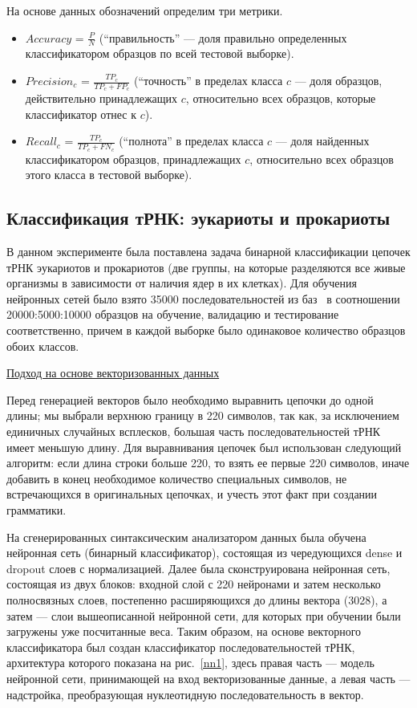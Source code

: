 На основе данных обозначений определим три метрики.
\begin{itemize}
    \item $Accuracy$ = $\frac{P}{N}$ (``правильность'' --- доля правильно определенных классификатором образцов по всей тестовой выборке).
    \item $Precision_{c}$ = $\frac{TP_{c}}{TP_{c} + FP_{c}}$ (``точность'' в пределах класса $c$ --- доля образцов, действительно принадлежащих $c$, относительно всех образцов, которые классификатор отнес к $c$).
    \item $Recall_{c}$ = $\frac{TP_{c}}{TP_{c} + FN_{c}}$  (``полнота'' в пределах класса $c$ --- доля найденных классификатором образцов, принадлежащих $c$, относительно всех образцов этого класса в тестовой выборке).
\end{itemize}


\subsection{Классификация тРНК: эукариоты и прокариоты}
В данном эксперименте была поставлена задача бинарной классификации цепочек тРНК эукариотов и прокариотов (две группы, на которые разделяются все живые организмы в зависимости от наличия ядер в их клетках). Для обучения нейронных сетей было взято 35000 последовательностей из баз~\cite{trnadb1,trnadb2} в соотношении 20000:5000:10000  образцов на обучение, валидацию и тестирование соответственно, причем в каждой выборке было одинаковое количество образцов обоих классов.

\underline{Подход на основе векторизованных данных}

Перед генерацией векторов было необходимо выравнить цепочки до одной длины; мы выбрали верхнюю границу в 220 символов, так как, за исключением единичных случайных всплесков, большая часть последовательностей тРНК имеет меньшую длину. Для выравнивания цепочек был использован следующий алгоритм: если длина строки больше 220, то взять ее первые 220 символов, иначе добавить в конец необходимое количество специальных символов, не встречающихся в оригинальных цепочках, и учесть этот факт при создании грамматики.

На сгенерированных синтаксическим анализатором данных была обучена нейронная сеть (бинарный классификатор), состоящая из чередующихся dense и dropout слоев с нормализацией. Далее была сконструирована нейронная сеть, состоящая из двух блоков: входной слой с 220 нейронами и затем несколько полносвязных слоев, постепенно расширяющихся до длины вектора (3028), а затем --- слои вышеописанной нейронной сети, для которых при обучении были загружены уже посчитанные веса. Таким образом, на основе векторного классификатора был создан классификатор последовательностей тРНК, архитектура которого показана на рис.~\ref{nn1}, здесь правая часть --- модель нейронной сети, принимающей на вход векторизованные данные, а левая часть --- надстройка, преобразующая нуклеотидную последовательность в вектор.

